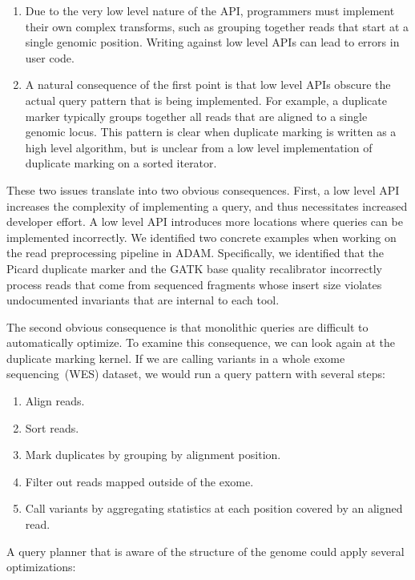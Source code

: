 \documentclass[phd]{ucbthesis}
\begin{document}
\begin{enumerate}
\item Due to the very low level nature of the API, programmers must implement
  their own complex transforms, such as grouping together reads that start at a
  single genomic position. Writing against low level APIs can lead to errors in user code.
\item A natural consequence of the first point is that low level APIs obscure
  the actual query pattern that is being implemented. For example, a duplicate
  marker typically groups together all reads that are aligned to a single genomic
  locus. This pattern is clear when duplicate marking is written as a high
  level algorithm, but is unclear from a low level implementation of duplicate
  marking on a sorted iterator.
\end{enumerate}

These two issues translate into two obvious consequences. First, a low level API
increases the complexity of implementing a query, and thus necessitates increased
developer effort. A low level API introduces more locations where queries can be
implemented incorrectly. We identified two concrete examples when
working on the read preprocessing pipeline in {ADAM}. Specifically, we
identified that the {Picard} duplicate marker and the {GATK}
base quality recalibrator incorrectly process reads that come from sequenced
fragments whose insert size violates undocumented invariants that are internal
to each tool.

The second obvious consequence is that monolithic queries are difficult to
automatically optimize. To examine this consequence, we can look again at the
duplicate marking kernel. If we are calling variants in a whole exome
sequencing~(WES) dataset, we would run a query pattern with several steps:

\begin{enumerate}
\item Align reads.
\item Sort reads.
\item Mark duplicates by grouping by alignment position.
\item Filter out reads mapped outside of the exome.
\item Call variants by aggregating statistics at each position covered by an
  aligned read.
\end{enumerate}

A query planner that is aware of the structure of the genome could apply several
optimizations:
\end{document}
